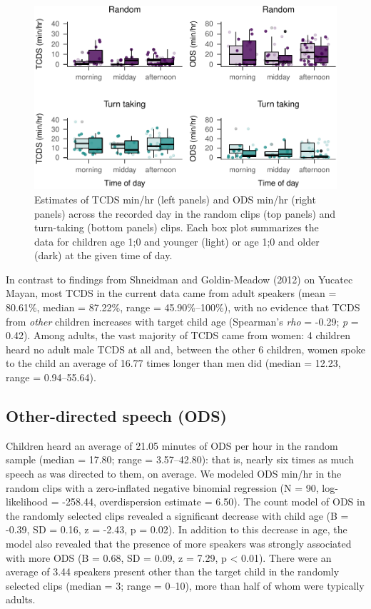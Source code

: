 \documentclass[floatsintext,man]{apa6}
\theoremstyle{definition}
\theoremstyle{definition}
\theoremstyle{definition}
\theoremstyle{remark}
\begin{document}
\begin{figure}
\centering
\includegraphics{Tseltal-CLE_files/figure-latex/fig5-1.pdf}
\caption{\label{fig:fig5}Estimates of TCDS min/hr (left panels) and ODS
min/hr (right panels) across the recorded day in the random clips (top
panels) and turn-taking (bottom panels) clips. Each box plot summarizes
the data for children age 1;0 and younger (light) or age 1;0 and older
(dark) at the given time of day.}
\end{figure}

In contrast to findings from Shneidman and Goldin-Meadow (2012) on
Yucatec Mayan, most TCDS in the current data came from adult speakers
(mean = 80.61\%, median = 87.22\%, range = 45.90\%--100\%), with no
evidence that TCDS from \emph{other} children increases with target
child age (Spearman's \emph{rho} = -0.29; \emph{p} = 0.42). Among
adults, the vast majority of TCDS came from women: 4 children heard no
adult male TCDS at all and, between the other 6 children, women spoke to
the child an average of 16.77 times longer than men did (median = 12.23,
range = 0.94--55.64).

\subsection{Other-directed speech
(ODS)}\label{other-directed-speech-ods}

Children heard an average of 21.05 minutes of ODS per hour in the random
sample (median = 17.80; range = 3.57--42.80): that is, nearly six times
as much speech as was directed to them, on average. We modeled ODS
min/hr in the random clips with a zero-inflated negative binomial
regression (N = 90, log-likelihood = -258.44, overdispersion estimate =
6.50). The count model of ODS in the randomly selected clips revealed a
significant decrease with child age (B = -0.39, SD = 0.16, z = -2.43, p
= 0.02). In addition to this decrease in age, the model also revealed
that the presence of more speakers was strongly associated with more ODS
(B = 0.68, SD = 0.09, z = 7.29, p \textless{} 0.01). There were an
average of 3.44 speakers present other than the target child in the
randomly selected clips (median = 3; range = 0--10), more than half of
whom were typically adults.
\end{document}
